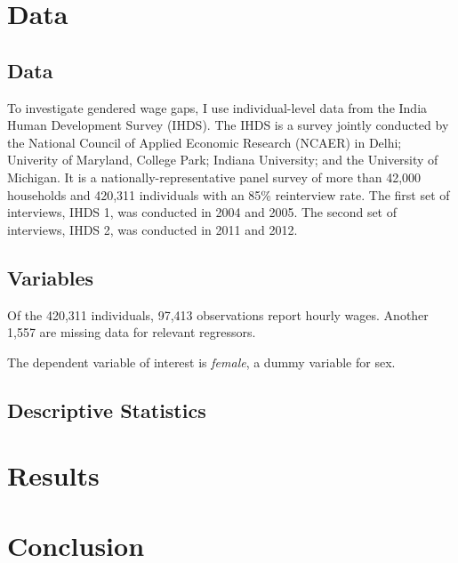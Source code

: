 \documentclass[12pt]{article}
\begin{document}
\section{Data
\label{sec:data}}

\subsection{Data}
To investigate gendered wage gaps, I use individual-level data from the India Human Development Survey (IHDS). The IHDS is a survey jointly conducted by the National Council of Applied Economic Research (NCAER) in Delhi; Univerity of Maryland, College Park; Indiana University; and the University of Michigan. It is a nationally-representative panel survey of more than 42,000 households and 420,311 individuals with an 85\% reinterview rate. The first set of interviews, IHDS 1, was conducted in 2004 and 2005. The second set of interviews, IHDS 2, was conducted in 2011 and 2012.

\subsection{Variables}

Of the 420,311 individuals, 97,413 observations report hourly wages. Another 1,557 are missing data for relevant regressors.

The dependent variable of interest is \textit{female}, a dummy variable for sex. 



\subsection{Descriptive Statistics}



\section{Results
\label{sec:results}}

\section{Conclusion\
\label{sec:conclusion}}

\clearpage
\begin{singlespace}
%
%


\end{singlespace}
\end{document}
